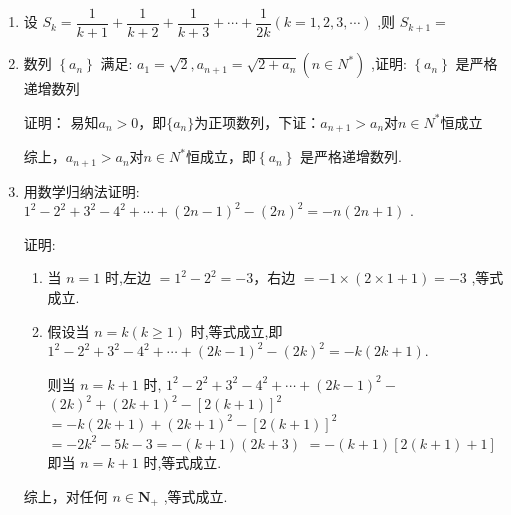 \begin{enumerate}
    \item 设 ${S}_{k} = \dfrac{1}{k + 1} + \dfrac{1}{k + 2} + \dfrac{1}{k + 3} + \cdots  + \dfrac{1}{2k}\left( {k = 1,2,3,\cdots }\right)$ ,则 ${S}_{k + 1} =$      
    
    \item 数列 $\left\{  {a}_{n}\right\}$ 满足: ${a}_{1} = \sqrt{2},{a}_{n + 1} = \sqrt{2 + {a}_{n}}\left( {n \in  {N}^{ * }}\right)$ ,证明: $\left\{  {a}_{n}\right\}$ 是严格递增数列
    \begin{jieda}
        证明：
        易知$a_n > 0$，即$\{a_n\}$为正项数列，下证：$a_{n+1} > a_n$对$n \in N^*$恒成立
        综上，$a_{n+1} > a_n$对$n \in N^*$恒成立，即$\left\{  {a}_{n}\right\}$ 是严格递增数列.
    \end{jieda}
    
    \item 用数学归纳法证明: ${1}^{2} - {2}^{2} + {3}^{2} - {4}^{2} + \cdots  + {\left( 2n - 1\right) }^{2} - {\left( 2n\right) }^{2} =  - n\left( {{2n} + 1}\right)$ .
    \begin{jieda}
        证明: 
        \begin{enumerate}
            \item 当 $n = 1$ 时,左边 $= {1}^{2} - {2}^{2} =  - 3$，右边 $=  - 1 \times  \left( {2 \times  1 + 1}\right)  =  - 3$ ,等式成立.
            \item 假设当 $n = k\left( {k \geq  1}\right)$ 时,等式成立,即${1}^{2} - {2}^{2} + {3}^{2} - {4}^{2} + \cdots  + {\left( 2k - 1\right) }^{2} - {\left( 2k\right) }^{2} =  - k\left( {{2k} + 1}\right) .$
            
            则当 $n = k + 1$ 时, ${1}^{2} - {2}^{2} + {3}^{2} - {4}^{2} + \cdots  + {\left( 2k - 1\right) }^{2} -$
            ${\left( 2k\right) }^{2} + {\left( 2k + 1\right) }^{2} - {\left\lbrack  2\left( k + 1\right) \right\rbrack  }^{2}$
            $=  - k\left( {{2k} + 1}\right)  + {\left( 2k + 1\right) }^{2} - {\left\lbrack  2\left( k + 1\right) \right\rbrack  }^{2}$
            $=  - 2{k}^{2} - {5k} - 3 =  - \left( {k + 1}\right) \left( {{2k} + 3}\right)$
            $=  - \left( {k + 1}\right) \left\lbrack  {2\left( {k + 1}\right)  + 1}\right\rbrack$
            即当 $n = k + 1$ 时,等式成立.
        \end{enumerate}
        综上，对任何 $n \in  {\mathbf{N}}_{ + }$ ,等式成立.
    \end{jieda}
    

\end{enumerate}
